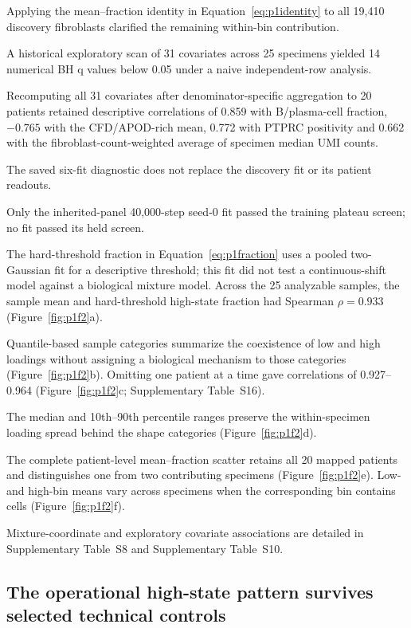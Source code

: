 \documentclass[10pt,a4paper]{article}
\begin{document}
Applying the mean--fraction identity in Equation~\eqref{eq:p1identity} to all 19,410 discovery fibroblasts clarified the remaining within-bin contribution.

A historical exploratory scan of 31 covariates across 25 specimens yielded 14 numerical BH q values below 0.05 under a naive independent-row analysis.

Recomputing all 31 covariates after denominator-specific aggregation to 20 patients retained descriptive correlations of 0.859 with B/plasma-cell fraction, $-0.765$ with the CFD/APOD-rich mean, 0.772 with PTPRC positivity and 0.662 with the fibroblast-count-weighted average of specimen median UMI counts.

The saved six-fit diagnostic does not replace the discovery fit or its patient readouts.

Only the inherited-panel 40,000-step seed-0 fit passed the training plateau screen; no fit passed its held screen.

\FloatBarrier
The hard-threshold fraction in Equation~\eqref{eq:p1fraction} uses a pooled two-Gaussian fit for a descriptive threshold; this fit did not test a continuous-shift model against a biological mixture model. Across the 25 analyzable samples, the sample mean and hard-threshold high-state fraction had Spearman $\rho=0.933$ (Figure~\ref{fig:p1f2}a\label{call:p1f2}).



Quantile-based sample categories summarize the coexistence of low and high loadings without assigning a biological mechanism to those categories (Figure~\ref{fig:p1f2}b). Omitting one patient at a time gave correlations of 0.927--0.964 (Figure~\ref{fig:p1f2}c; Supplementary Table~S16).

The median and 10th--90th percentile ranges preserve the within-specimen loading spread behind the shape categories (Figure~\ref{fig:p1f2}d).

The complete patient-level mean--fraction scatter retains all 20 mapped patients and distinguishes one from two contributing specimens (Figure~\ref{fig:p1f2}e). Low- and high-bin means vary across specimens when the corresponding bin contains cells (Figure~\ref{fig:p1f2}f).

Mixture-coordinate and exploratory covariate associations are detailed in Supplementary Table~S8 and Supplementary Table~S10.

\subsection{The operational high-state pattern survives selected technical controls}
\end{document}
